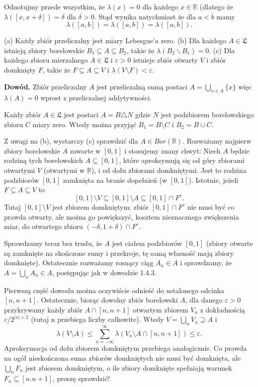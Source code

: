 Odnotujmy przede wszystkim, że \( \lambda(x) = 0 \) dla każdego \( x \in \mathbb{R} \) (dlatego że \( \lambda([x, x + \delta]) = \delta \) dla \( \delta > 0 \). Stąd wynika natychmiast że dla \( a < b \) mamy
\[
\lambda([a, b]) = \lambda([a, b]) = \lambda([a, b]).
\]

\begin{theorem}[1.6.1]
(a) Każdy zbiór przeliczalny jest miary Lebesgue’a zero.
(b) Dla każdego \( A \in \mathfrak{L} \) istnieją zbiory borelowskie \( B_1 \subseteq A \subseteq B_2 \), takie że \( \lambda(B_2 \backslash B_1) = 0 \).
(c) Dla każdego zbioru mierzalnego \( A \in \mathfrak{L} \) i \(\varepsilon > 0\) istnieje zbiór otwarty \( V \) i zbiór domknięty \( F \), takie że \( F \subseteq A \subseteq V \) i \(\lambda(V \setminus F) < \varepsilon\).
\end{theorem}

\textbf{Dowód.} Zbiór przeliczalny \( A \) jest przeliczalną sumą postaci \( A = \bigcup_{x \in A}\{x\} \) więc \(\lambda(A) = 0\) wprost z przeliczalnej addytywności.

Każdy zbiór \( A \in \mathfrak{L} \) jest postaci \( A = B \triangle N \) gdzie \( N \) jest podzbiorem borelowskiego zbioru \( C \) miary zero. Wtedy można przyjąć \( B_1 = B \setminus C \) i \( B_2 = B \cup C \).

Z uwagi na (b), wystarczy (c) sprawdzić dla \( A \in Bor(\mathbb{R}) \). Rozważamy najpierw zbiory borelowskie \( A \) zawarte w \([0,1]\) i stosujemy znany chwyt: Niech \( A \) będzie rodziną tych borelowskich \( A \subseteq [0,1]\), które aproksymują się od góry zbiorami otwartymi \( V \) (otwartymi w \(\mathbb{R}\)), i od dołu zbiorami domkniętymi. Jest to rodzina podzbiorów \([0,1]\) zamknięta na branie dopełnień (w \([0,1]\)). Istotnie, jeżeli \( F \subseteq A \subseteq V \) to
\[
[0,1] \setminus V \subseteq [0,1] \setminus A \subseteq [0,1] \cap F^c.
\]
Tutaj \([0,1] \setminus V\) jest zbiorem domkniętym; zbiór \([0,1] \cap F^c\) nie musi być co prawda otwarty, ale można go powiększyć, kosztem nieznacznego zwiększenia miar, do otwartego zbioru \((-\delta, 1 + \delta) \cap F^c\).

Sprawdzamy teraz bez trudu, że \( A \) jest ciałem podzbiorów \([0,1]\) (zbiory otwarte są zamknięte na skończone sumy i przekroje, tę samą własność mają zbiory domknięte). Ostatecznie rozważamy rosnący ciąg \( A_n \in A \) i sprawdzamy, że \( A = \bigcup_n A_n \in A \), postępując jak w dowodzie 1.4.3.

Pierwszą część dowodu można oczywiście odnieść do ustalonego odcinka \([n,n+1]\). Ostatecznie, biorąc dowolny zbiór borelowski \( A \), dla danego \(\varepsilon > 0\) przykrywamy każdy zbiór \( A \cap [n,n+1] \) otwartym zbiorem \( V_n \) z dokładnością \(\varepsilon/2^{|n|+2} \) (tutaj n przebiega liczby całkowite). Wtedy \( V = \bigcup_n V_n \supseteq A \) i
\[
\lambda(V \setminus A) \leq \sum_{n=-\infty}^{\infty} \lambda(V_n \setminus A \cap [n,n+1]) \leq \varepsilon.
\]
Aproksymacja od dołu zbiorem domkniętym przebiega analogicznie. Co prawda na ogół nieskończona suma zbiorów domkniętych nie musi być domknięta, ale \( \bigcup_n F_n \) jest zbiorem domkniętym, o ile zbiory domknięte spełniają warunek \( F_n \subseteq [n.n+1] \), proszę sprawdzić!

